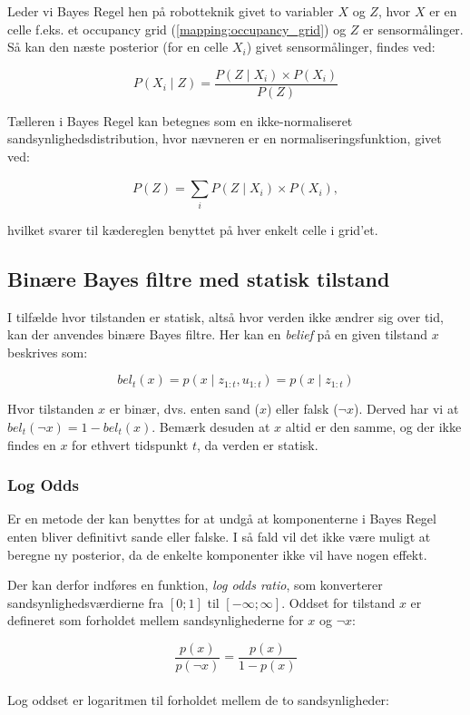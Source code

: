 Leder vi Bayes Regel hen på robotteknik givet to variabler $X$ og $Z$, hvor $X$ er en celle f.eks. et occupancy grid (\cref{mapping:occupancy_grid}) og $Z$ er sensormålinger.
Så kan den næste posterior (for en celle $X_i$) givet sensormålinger, findes ved:

$$P(X_i \mid Z) = \frac{P(Z \mid X_i) \times P(X_i)}{P(Z)}$$

Tælleren i Bayes Regel kan betegnes som en ikke-normaliseret sandsynlighedsdistribution, hvor nævneren er en normaliseringsfunktion, givet ved:

$$P(Z) = \sum_{i}^{} P(Z \mid X_i) \times P(X_i),$$

hvilket svarer til kædereglen benyttet på hver enkelt celle i grid'et.


\subsection{Binære Bayes filtre med statisk tilstand}\label{bayes_binaerfiltre}
I tilfælde hvor tilstanden er statisk, altså hvor verden ikke ændrer sig over tid, kan der anvendes binære Bayes filtre.
Her kan en \textit{belief} på en given tilstand $x$ beskrives som:

$$bel_t(x) = p(x \mid z_{1:t},u_{1:t}) = p(x \mid z_{1:t})$$

Hvor tilstanden $x$ er binær, dvs. enten sand ($x$) eller falsk ($\lnot x$).
Derved har vi at $bel_t(\lnot x) = 1 - bel_t(x)$.
Bemærk desuden at $x$ altid er den samme, og der ikke findes en $x$ for ethvert tidspunkt $t$, da verden er statisk.

\subsubsection{Log Odds}
Er en metode der kan benyttes for at undgå at komponenterne i Bayes Regel enten bliver definitivt sande eller falske.
I så fald vil det ikke være muligt at beregne ny posterior, da de enkelte komponenter ikke vil have nogen effekt.

Der kan derfor indføres en funktion, \textit{log odds ratio}, som konverterer sandsynlighedsværdierne fra $[0;1]$ til $[-\infty;\infty]$.
Oddset for tilstand $x$ er defineret som forholdet mellem sandsynlighederne for $x$ og $\lnot x$:\cite{probabilisticRobotics}

$$\frac{p(x)}{p(\lnot x)} = \frac{p(x)}{1 - p(x)}$$
\\
Log oddset er logaritmen til forholdet mellem de to sandsynligheder:

